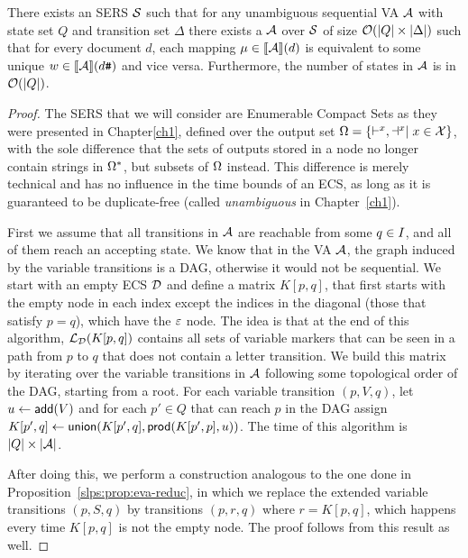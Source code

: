 \begin{proposition}\label{slps:prop:va-reduc}
	There exists an SERS $\mathcal{S}$ such that for any unambiguous sequential VA $\mathcal{A}$ with state set $Q$ and transition set $\Delta$ there exists a \crt $\mathcal{A}$ over $\mathcal{S}$ of size $\mathcal{O}(|Q|\times|\Delta|)$  such that for every document $d$, each mapping $\mu\in{\llbracket{\mathcal{A}}\rrbracket}(d)$ is equivalent to some unique $w\in{\llbracket{\mathcal{A}}\rrbracket}(d\texttt{\#})$ and vice versa. Furthermore, the number of states in $\mathcal{A}$ is in $\mathcal{O}(|Q|)$.
\end{proposition}
\begin{proof}
	The SERS that we will consider are Enumerable Compact Sets as they were presented in Chapter\ref{ch1}, defined over the output set $\Omega = \{\vdash^{x} , \dashv^{x}\mid x\in\mathcal{X}\}$, with the sole difference that the sets of outputs stored in a node no longer contain strings in $\Omega^*$, but subsets of $\Omega$ instead. This difference is merely technical and has no influence in the time bounds of an ECS, as long as it is guaranteed to be duplicate-free (called {\it unambiguous} in Chapter~\ref{ch1}). 
	
	First we assume that all transitions in $\mathcal{A}$ are reachable from some $q\in I$, and all of them reach an accepting state. We know that in the VA $\mathcal{A}$, the graph induced by the variable transitions is a DAG, otherwise it would not be sequential. We start with an empty ECS $\mathcal{D}$ and define a matrix $K[p,q]$, that first starts with the empty node in each index except the indices in the diagonal (those that satisfy $p = q$), which have the $\varepsilon$ node. 
	The idea is that at the end of this algorithm, $\mathcal{L}_{\mathcal{D}}(K[p,q])$ contains all sets of variable markers that can be seen in a path from $p$ to $q$ that does not contain a letter transition. We build this matrix by iterating over the variable transitions in $\mathcal{A}$ following some topological order of the DAG, starting from a root. For each variable transition $(p,V,q)$, let $u\gets\mathsf{add}(V)$ and for each $p'\in Q$ that can reach $p$ in the DAG assign $K[p',q] \gets \mathsf{union}(K[p',q], \mathsf{prod}(K[p', p], u))$. The time of this algorithm is $|Q|\times|\mathcal{A}|$.
	
	After doing this, we perform a construction analogous to the one done in Proposition~\ref{slps:prop:eva-reduc}, in which we replace the extended variable transitions $(p,S,q)$ by transitions $(p,r,q)$ where $r = K[p,q]$, which happens every time $K[p,q]$ is not the empty node. The proof follows from this result as well.
\end{proof}

